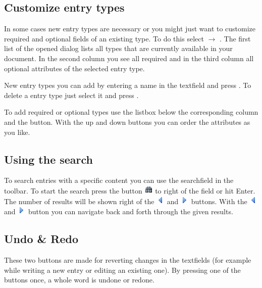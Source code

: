 \documentclass[a4paper,10pt]{scrartcl}
\begin{document}
\subsection{Customize entry types}
In some cases new entry types are necessary or you might just want to customize
required and optional fields of an existing type. To do this select \edit
$\rightarrow$ \customizeentrytyp. The first list of the opened dialog lists all
types that are currently available in your document. In the second column you
see all required and in the third column all optional attributes of the selected
entry type.

New entry types you can add by entering a name in the textfield and press \add.
To delete a entry type just select it and press \remove.

To add required or optional types use the listbox below the corresponding
column and the \add button. With the up and down buttons you can order the
attributes as you like.
\subsection{Using the search}
To search entries with a specific content you can use the searchfield in the
toolbar. To start the search press the button
\includegraphics{./images/find.png} to right of the field or hit Enter.
The number of results will be shown right of the
\includegraphics{./images/resultset_previous.png} and
\includegraphics{./images/resultset_next.png} buttons. With the
\includegraphics{./images/resultset_previous.png} and
\includegraphics{./images/resultset_next.png} button you can navigate back
and forth through the given results.
\subsection{Undo \& Redo}
\label{undoredo}
These two buttons are made for reverting changes in the textfields (for example
while writing a new entry or editing an existing one). By pressing one of the
buttons once, a whole word is undone or redone.
\end{document}
